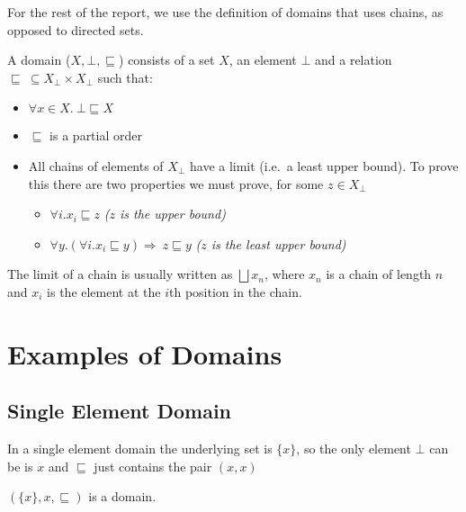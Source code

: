 For the rest of the report, we use the definition of domains that uses chains, as opposed to directed sets.
\vspace{0.5cm}
\begin{defn}
A domain ($X, \bot, \sqsubseteq$) consists of a set $X$, an element $\bot$ and a relation $\sqsubseteq \ \subseteq X_\bot \times X_\bot$ such that:

\begin{itemize}
\item{$\forall x \in X. \ \bot \sqsubseteq X$}
\item{$\sqsubseteq$ is a partial order}
\item{All chains of elements of $X_\bot$ have a limit (i.e.\ a least upper bound). To prove this there are two properties we must prove, for some $z \in X_\bot$}
\begin{itemize}
 \item{$\forall i. x_i \sqsubseteq z$ \hspace{1cm} \emph{($z$ is the upper bound)}}
 \item{$\forall y. (\forall i.x_i  \sqsubseteq y) \Rightarrow \ z \sqsubseteq y$ \hspace{0.25cm} \emph{($z$ is the least upper bound)}}
\end{itemize}
\end{itemize}

The limit of a chain is usually written as $\bigsqcup x_n$, where $x_n$ is a chain of length $n$ and $x_i$ is the element at the $i$th position in the chain.

\end{defn} 

\section{Examples of Domains}\label{ex}
\subsection{Single Element Domain}\label{single}
In a single element domain the underlying set is $\{x\}$, so the only element $\bot$ can be is $x$ and $\sqsubseteq$ just contains the pair $(x,x)$

\vspace{0.5cm}

\begin{lem}
$(\{x\},x,\sqsubseteq)$ is a domain.
\end{lem}

